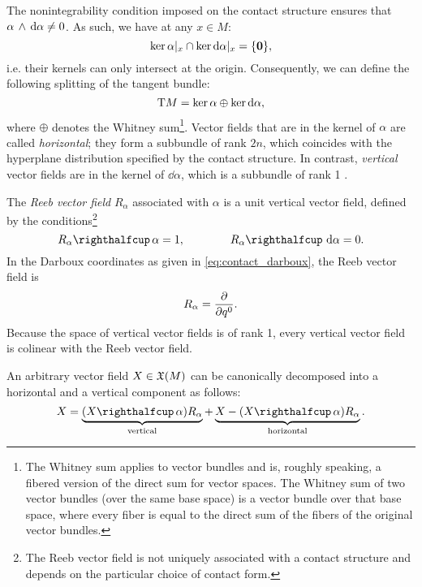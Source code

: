 The nonintegrability condition imposed on the contact structure ensures that \( \alpha\,\wedge\,\dd{\alpha}  \neq 0\). As such, we have at any \(x\in M\):
\begin{equation}
     \ker{\alpha}\vert_x \cap \ker{\dd{\alpha}}\vert_x = \qty{\mathbf{0}},
\end{equation}
i.e. their kernels can only intersect at the origin. Consequently, we can define the following splitting of the tangent bundle:
\begin{equation}
     \mathrm{T}M = \ker{\alpha}\oplus\ker{\dd{\alpha}},
\end{equation}
where \(\oplus\) denotes the Whitney sum\footnote{The Whitney sum applies to vector bundles and is, roughly speaking, a fibered version of the direct sum for vector spaces. The Whitney sum of two vector bundles (over the same base space) is a vector bundle over that base space, where every fiber is equal to the direct sum of the fibers of the original vector bundles.}. Vector fields that are in the kernel of \(\alpha\) are called \emph{horizontal}; they form a subbundle of rank \(2n\), which coincides with the hyperplane distribution specified by the contact structure. In contrast, \emph{vertical} vector fields are in the kernel of \(\dd{\alpha}\), which is a subbundle of rank 1 \cite{Libermann1987}.

The \emph{Reeb vector field} \(R_\alpha\) associated with \(\alpha\) is a unit vertical vector field, defined by the conditions\footnote{The Reeb vector field is not uniquely associated with a contact structure and depends on the particular choice of contact form.}
    \begin{equation}
     \intpr{R_\alpha}{\alpha} = 1, \qquad \qquad \intpr{R_\alpha}{\dd{\alpha}} = 0.
\end{equation}
In the Darboux coordinates as given in \cref{eq:contact_darboux}, the Reeb vector field is
    \begin{equation}
     R_\alpha = \pdv{}{q^0}.
\end{equation} 
Because the space of vertical vector fields is of rank 1, every vertical vector field is colinear with the Reeb vector field.

An arbitrary vector field \(X \in \mathfrak{X}\qty(M)\) can be canonically decomposed into a horizontal and a vertical component as follows:
\begin{equation}
    X = \underbrace{(\intpr{X}{\alpha})R_\alpha}_\text{vertical} + \underbrace{X - (\intpr{X}{\alpha})R_\alpha}_\text{horizontal}.
    \label{eq:vfield_splitting}
\end{equation}

